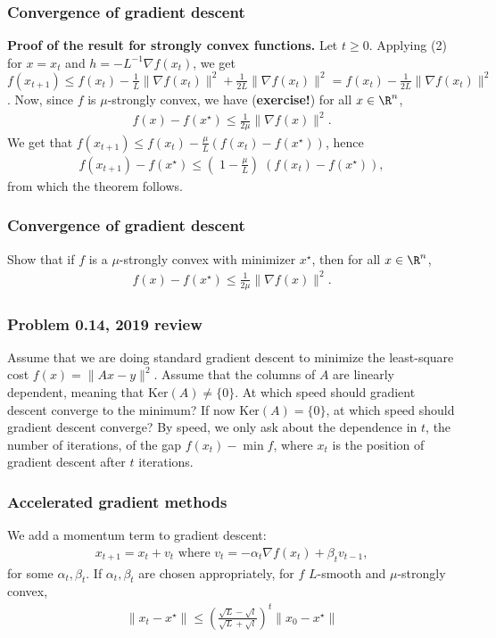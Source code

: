 \documentclass{beamer}
\begin{document}
\begin{frame}[t]
\frametitle{Convergence of gradient descent}
\textbf{Proof of the result for strongly convex functions.}
Let $t \geq 0$. Applying (2) for $x = x_t$ and $h = -L^{-1} \nabla f(x_t)$, we get
$f(x_{t+1}) \leq f(x_t) - \frac{1}{L} \|\nabla f(x_t)\|^2 + \frac{1}{2L} \|\nabla f(x_t)\|^2 = f(x_t) -  \frac{1}{2L} \|\nabla f(x_t)\|^2$.
Now, since $f$ is $\mu$-strongly convex, we have (\textbf{exercise!}) for all $x \in \R^n$,
\begin{align*}
f(x)-f(x^{\star}) \leq \frac{1}{2 \mu}\|\nabla f(x)\|^2.
\end{align*} 
We get that $f(x_{t+1}) \leq f(x_t) - \frac{\mu}{L} (f(x_t) - f(x^{\star}))$, hence
\begin{align*}
f(x_{t+1})-f(x^{\star}) \leq \left(􏰉1- \frac{\mu}{L} \right) 􏰊(f(x_t)-f(x^{\star})),
\end{align*}
from which the theorem follows.
\end{frame}

\begin{frame}[t]
\frametitle{Convergence of gradient descent}
Show that if $f$ is a $\mu$-strongly convex with minimizer $x^{\star}$, then for all $x \in \R^n$,
\begin{align*}
f(x)-f(x^{\star}) \leq \frac{1}{2 \mu}\|\nabla f(x)\|^2.
\end{align*} 
\pause
\end{frame}

\begin{frame}[t]
\frametitle{Problem 0.14, 2019 review}
Assume that we are doing standard gradient descent to minimize the least-square cost
$f(x) = \|Ax - y\|^2$.
Assume that the columns of $A$ are linearly dependent, meaning that $\text{Ker}(A) \neq \{0\}$. At which speed should gradient descent converge to the minimum? If now $\text{Ker}(A) = \{0\}$, at which speed should gradient descent converge? By speed, we only ask about the dependence in $t$, the number of iterations, of the gap $f(x_t)-\min f$, where $x_t$ is the position of gradient descent after $t$ iterations.
\pause
\pause
\end{frame}

\begin{frame}[t]
\frametitle{Accelerated gradient methods}
\vspace{-8pt}
\begin{theorem}
We add a momentum term to gradient descent:
\begin{align}
x_{t+1} = x_t + v_t \text{ where } v_t = -\alpha_t \nabla f(x_t) + \beta_t v_{t-1},
\end{align}
for some $\alpha_t, \beta_t$. If $\alpha_t, \beta_t$ are chosen appropriately, for $f$ $L$-smooth and $\mu$-strongly convex,
\begin{align}
\|x_t-x^{\star}\| \leq \left( \frac{\sqrt{L}-\sqrt{l}}{\sqrt{L}+\sqrt{l}} \right)^t \|x_0-x^{\star}\| 
\end{align}
\end{theorem}
\end{frame}
\end{document}
